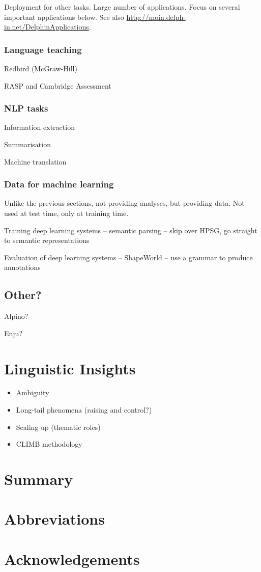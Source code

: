 \documentclass[output=paper]{langsci/langscibook}
\begin{document}
Deployment for other tasks.
Large number of applications.
Focus on several important applications below.
See also \url{http://moin.delph-in.net/DelphinApplications}.


\subsubsection{Language teaching}

Redbird (McGraw-Hill)

RASP and Cambridge Assessment


\subsubsection{NLP tasks}

Information extraction

Summarisation

Machine translation



\subsubsection{Data for machine learning}

Unlike the previous sections,
not providing analyses, but providing data.
Not used at test time, only at training time.

Training deep learning systems
-- semantic parsing
-- skip over HPSG, go straight to semantic representations

Evaluation of deep learning systems
-- ShapeWorld
-- use a grammar to produce annotations


\subsection{Other?}

Alpino?

Enju?



\section{Linguistic Insights}
\begin{itemize}
    \item Ambiguity %
    \item Long-tail phenomena (raising and control?) %
    \item Scaling up (thematic roles) %
    \item CLIMB methodology %
\end{itemize}

\section{Summary}

\section*{Abbreviations}
\section*{Acknowledgements}

\printbibliography[heading=subbibliography,notkeyword=this] 
\end{document}
